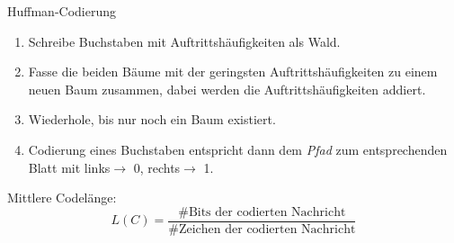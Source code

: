 \begin{algo}{Huffman-Codierung}
    \begin{enumerate}
        \item Schreibe Buchstaben mit Auftrittshäufigkeiten als \glqq Wald\grqq.
        \item Fasse die beiden Bäume mit der geringsten Auftrittshäufigkeiten zu einem neuen Baum zusammen, dabei werden die Auftrittshäufigkeiten addiert.
        \item Wiederhole, bis nur noch ein Baum existiert.
        \item Codierung eines Buchstaben entspricht dann dem \emph{Pfad} zum entsprechenden Blatt mit \glqq links\grqq $\to$ 0, \glqq rechts\grqq $\to$ 1.
    \end{enumerate}

    Mittlere Codelänge:
    $$
        L(C) = \frac{\#\text{Bits der codierten Nachricht}}{\#{\text{Zeichen der codierten Nachricht}}}
    $$
\end{algo}

